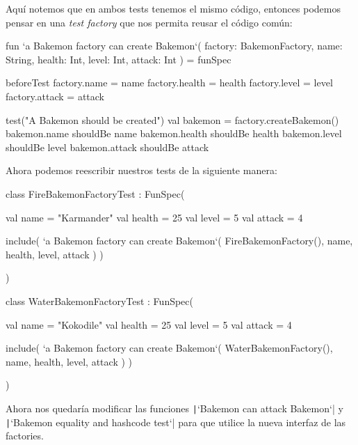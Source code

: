   Aquí notemos que en ambos tests tenemos el mismo código, entonces podemos pensar en una 
  \textit{test factory} que nos permita reusar el código común:

  \begin{kotlin}
    fun `a Bakemon factory can create Bakemon`(
      factory: BakemonFactory, name: String, health: Int, level: Int, attack: Int
    ) = funSpec {
      beforeTest {
        factory.name = name
        factory.health = health
        factory.level = level
        factory.attack = attack
      }

      test("A Bakemon should be created") {
        val bakemon = factory.createBakemon()
        bakemon.name shouldBe name
        bakemon.health shouldBe health
        bakemon.level shouldBe level
        bakemon.attack shouldBe attack
      }
    }
  \end{kotlin}

  Ahora podemos reescribir nuestros tests de la siguiente manera:

  \begin{kotlin}
    class FireBakemonFactoryTest : FunSpec({
      val name = "Karmander"
      val health = 25
      val level = 5
      val attack = 4
      
      include(
        `a Bakemon factory can create Bakemon`(
          FireBakemonFactory(), name, health, level, attack
        )
      )
    })
  \end{kotlin}

  \begin{kotlin}
    class WaterBakemonFactoryTest : FunSpec({
      val name = "Kokodile"
      val health = 25
      val level = 5
      val attack = 4

      include(
        `a Bakemon factory can create Bakemon`(
          WaterBakemonFactory(), name, health, level, attack
        )
      )
    })
  \end{kotlin}
    
  Ahora nos quedaría modificar las funciones \texttt|`Bakemon can attack Bakemon`| y
  \texttt|`Bakemon equality and hashcode test`|
  para que
  utilice la nueva interfaz de las factories.

